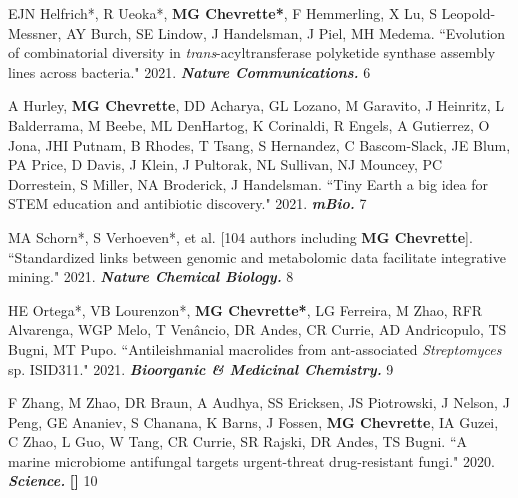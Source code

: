 \begin{cvpubs}
\cvpub
{EJN Helfrich*, R Ueoka*, \textbf{MG Chevrette*}, F Hemmerling, X Lu, S Leopold-Messner, AY Burch, SE Lindow, J Handelsman, J Piel, MH Medema. ``Evolution of combinatorial diversity in \textit{trans}-acyltransferase polyketide synthase assembly lines across bacteria." 2021. \textit{\textbf{Nature Communications.}} \textit{\textbf{}}}
{6}

\cvpub
{A Hurley, \textbf{MG Chevrette}, DD Acharya, GL Lozano, M Garavito, J Heinritz, L Balderrama, M Beebe, ML DenHartog, K Corinaldi, R Engels, A Gutierrez, O Jona, JHI Putnam, B Rhodes, T Tsang, S Hernandez, C Bascom-Slack, JE Blum, PA Price, D Davis, J Klein, J Pultorak, NL Sullivan, NJ Mouncey, PC Dorrestein, S Miller, NA Broderick, J Handelsman. ``Tiny Earth\: a big idea for STEM education and antibiotic discovery." 2021. \textit{\textbf{mBio.}} \textit{\textbf{}}}
{7}

\cvpub
{MA Schorn*, S Verhoeven*, et al. [104 authors including \textbf{MG Chevrette}]. ``Standardized links between genomic and metabolomic data facilitate integrative mining." 2021. \textit{\textbf{Nature Chemical Biology.}} \textit{\textbf{}}}
{8}

\cvpub
{HE Ortega*, VB Lourenzon*, \textbf{MG Chevrette*}, LG Ferreira, M Zhao, RFR Alvarenga, WGP Melo, T Venâncio, DR Andes, CR Currie, AD Andricopulo, TS Bugni, MT Pupo. ``Antileishmanial macrolides from ant-associated \textit{Streptomyces} sp. ISID311." 2021. \textit{\textbf{Bioorganic \& Medicinal Chemistry.}} \textbf{\textit{}}}
{9}

\end{cvpubs} \begin{cvpubs}

\cvpub
{F Zhang, M Zhao, DR Braun, A Audhya, SS Ericksen, JS Piotrowski, J Nelson, J Peng, GE Ananiev, S Chanana, K Barns, J Fossen, \textbf{MG Chevrette}, IA Guzei, C Zhao, L Guo, W Tang, CR Currie, SR Rajski, DR Andes, TS Bugni. ``A marine microbiome antifungal targets urgent-threat drug-resistant fungi." 2020. \textit{\textbf{Science.}} \textbf{\textit{}} \linebreak
\textbf{[\textit{}]}}
{10}


\end{cvpubs}
